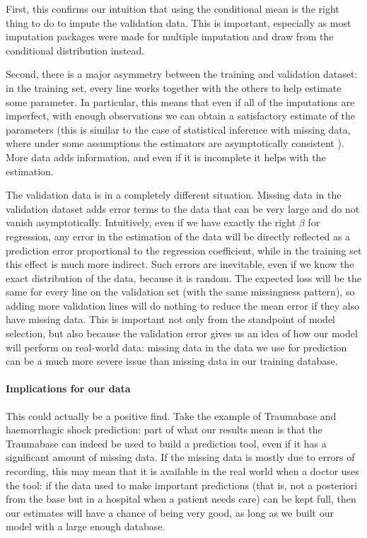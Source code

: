 \documentclass[12pt, a4paper]{memoir}
\begin{document}
First, this confirms our intuition that using the conditional mean is the right thing to do to impute the validation data. This is important, especially as most imputation packages were made for multiple imputation and draw from the conditional distribution instead.

Second, there is a major asymmetry between the training and validation dataset: in the training set, every line works together with the others to help estimate some parameter. In particular, this means that even if all of the imputations are imperfect, with enough observations we can obtain a satisfactory estimate of the parameters (this is similar to the case of statistical inference with missing data, where under some assumptions the estimators are asymptotically consistent \cite{rubin_ignorability}). More data adds information, and even if it is incomplete it helps with the estimation.

The validation data is in a completely different situation. Missing data in the validation dataset adds error terms to the data that can be very large and do not vanish asymptotically. Intuitively, even if we have exactly the right $\beta$ for regression, any error in the estimation of the data will be directly reflected as a prediction error proportional to the regression coefficient, while in the training set this effect is much more indirect. Such errors are inevitable, even if we know the exact distribution of the data, because it is random. The expected loss will be the same for every line on the validation set (with the same missingness pattern), so adding more validation lines will do nothing to reduce the mean error if they also have missing data. This is important not only from the standpoint of model selection, but also because the validation error gives us an idea of how our model will perform on real-world data: missing data in the data we use for prediction can be a much more severe issue than missing data in our training database.

\paragraph{Implications for our data}

This could actually be a positive find. Take the example of Traumabase and haemorrhagic shock prediction: part of what our results mean is that the Traumabase can indeed be used to build a prediction tool, even if it has a significant amount of missing data. If the missing data is mostly due to errors of recording, this may mean that it is available in the real world when a doctor uses the tool: if the data used to make important predictions (that is, not a posteriori from the base but in a hospital when a patient needs care) can be kept full, then our estimates will have a chance of being very good, as long as we built our model with a large enough database.
\end{document}
